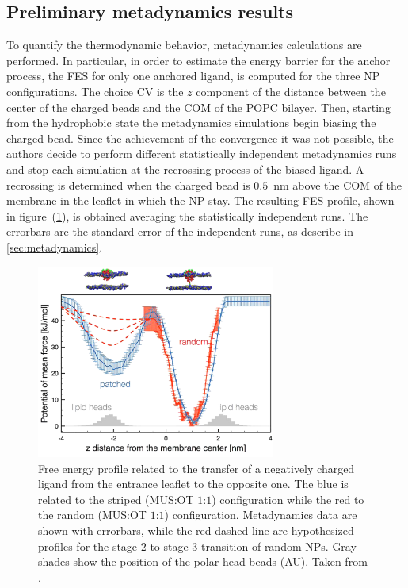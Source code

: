 \subsection{Preliminary metadynamics results}
\label{sec:preliminaryMetadyn}
To quantify the thermodynamic behavior, metadynamics calculations are performed. In particular, in order to estimate the energy barrier for the anchor process, the \ac{FES} for only one anchored ligand, is computed for the three \ac{NP} configurations. The choice \ac{CV} is the $z$ component of the distance between the center of the charged beads and the \ac{COM} of the \ac{POPC} bilayer. Then, starting from the hydrophobic state the metadynamics simulations begin biasing the charged bead. Since the achievement of the convergence it was not possible, the authors decide to perform different statistically independent metadynamics runs and stop each simulation at the recrossing process of the biased ligand. A recrossing is determined when the charged bead is $0.5$~nm above the \ac{COM} of the membrane in the leaflet in which the \ac{NP} stay. The resulting \ac{FES} profile, shown in figure~(\ref{fig:NPFES}), is obtained averaging the statistically independent runs. The errorbars are the standard error of the independent runs, as describe in \ref{sec:metadynamics}.
\begin{figure}[h!t]
	\centering
	\includegraphics[width=0.7\textwidth]{./img/NPFES}
	\caption{Free energy profile related to the transfer of a negatively charged ligand from the entrance leaflet to the opposite one. The blue is related to the striped (\ac{MUS}:\ac{OT} $1$:$1$) configuration while the red to the random (\ac{MUS}:\ac{OT} $1$:$1$) configuration. Metadynamics data are shown with errorbars, while the red dashed line are hypothesized profiles for the stage $2$ to stage $3$ transition of random \acp{NP}. Gray shades show the position of the polar head beads (AU). Taken from \cite{ourPaper}.}
	\label{fig:NPFES}
\end{figure}

